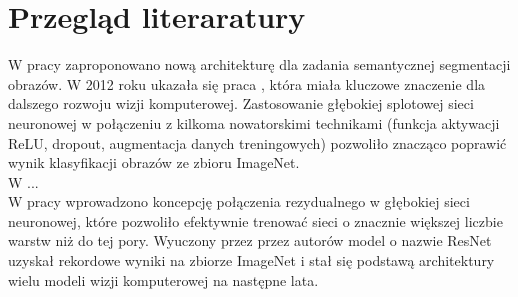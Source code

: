 \newpage %
\section{Przegląd literaratury}

W pracy \cite{unet} zaproponowano nową architekturę dla zadania semantycznej segmentacji obrazów. 
W 2012 roku ukazała się praca \cite{alexnet}, która miała kluczowe znaczenie dla dalszego rozwoju wizji komputerowej. Zastosowanie głębokiej splotowej sieci neuronowej w połączeniu z kilkoma nowatorskimi technikami (funkcja aktywacji ReLU, dropout, augmentacja danych treningowych) pozwoliło znacząco poprawić wynik klasyfikacji obrazów ze zbioru ImageNet.\\
W \cite{vggnet} ...\\
W pracy \cite{resnet} wprowadzono koncepcję połączenia rezydualnego w głębokiej sieci neuronowej, które pozwoliło efektywnie trenować sieci o znacznie większej liczbie warstw niż do tej pory. Wyuczony przez przez autorów model o nazwie ResNet uzyskał rekordowe wyniki na zbiorze ImageNet i stał się podstawą architektury wielu modeli wizji komputerowej na następne lata.\\

